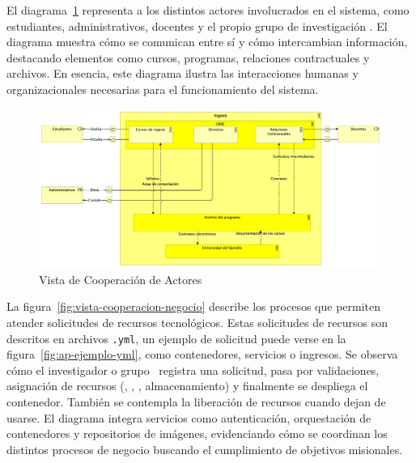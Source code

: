 El diagrama~\ref{fig:vista-cooperacion-actores} representa a los distintos actores involucrados en el sistema, como estudiantes, administrativos, docentes y el propio grupo de investigación \GRID. El diagrama muestra cómo se comunican entre sí y cómo intercambian información, destacando elementos como cursos, programas, relaciones contractuales y archivos. En esencia, este diagrama ilustra las interacciones humanas y organizacionales necesarias para el funcionamiento del sistema.

\begin{figure}[H]
    \centering
    \includegraphics[scale=0.16]{tablas-images/cp6/Actor-Cooperation-view.png}
    \caption{Vista de Cooperación de Actores}\label{fig:vista-cooperacion-actores}
\end{figure}
\noindent
La figura~\ref{fig:vista-cooperacion-negocio} describe los procesos que permiten atender solicitudes de recursos tecnológicos. Estas solicitudes de recursos son descritos en archivos \texttt{.yml}, un ejemplo de solicitud puede verse en la figura~\ref{fig:ap-ejemplo-yml}, como contenedores, servicios o ingresos. Se observa cómo el investigador o grupo \GRID\ registra una solicitud, pasa por validaciones, asignación de recursos (\CPU, \RAM, \GPU, almacenamiento) y finalmente se despliega el contenedor. También se contempla la liberación de recursos cuando dejan de usarse. El diagrama integra servicios como autenticación, orquestación de contenedores y repositorios de imágenes, evidenciando cómo se coordinan los distintos procesos de negocio buscando el cumplimiento de objetivos misionales.

